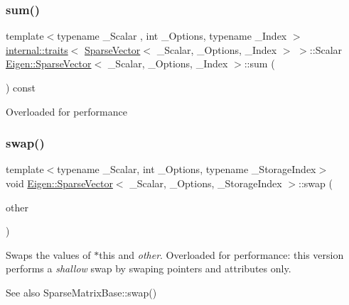 \subsubsection{\texorpdfstring{sum()}{sum()}}
{\footnotesize\ttfamily template$<$typename \+\_\+\+Scalar , int \+\_\+\+Options, typename \+\_\+\+Index $>$ \\
\mbox{\hyperlink{struct_eigen_1_1internal_1_1traits}{internal\+::traits}}$<$ \mbox{\hyperlink{class_eigen_1_1_sparse_vector}{Sparse\+Vector}}$<$ \+\_\+\+Scalar, \+\_\+\+Options, \+\_\+\+Index $>$ $>$\+::Scalar \mbox{\hyperlink{class_eigen_1_1_sparse_vector}{Eigen\+::\+Sparse\+Vector}}$<$ \+\_\+\+Scalar, \+\_\+\+Options, \+\_\+\+Index $>$\+::sum (\begin{DoxyParamCaption}{ }\end{DoxyParamCaption}) const}

Overloaded for performance \mbox{\label{class_eigen_1_1_sparse_vector_a977f1796d4b332a0827c5a1d7b1ed561}} 
\subsubsection{\texorpdfstring{swap()}{swap()}}
{\footnotesize\ttfamily template$<$typename \+\_\+\+Scalar, int \+\_\+\+Options, typename \+\_\+\+Storage\+Index$>$ \\
void \mbox{\hyperlink{class_eigen_1_1_sparse_vector}{Eigen\+::\+Sparse\+Vector}}$<$ \+\_\+\+Scalar, \+\_\+\+Options, \+\_\+\+Storage\+Index $>$\+::swap (\begin{DoxyParamCaption}\item[{\mbox{\hyperlink{class_eigen_1_1_sparse_vector}{Sparse\+Vector}}$<$ \+\_\+\+Scalar, \+\_\+\+Options, \+\_\+\+Storage\+Index $>$ \&}]{other }\end{DoxyParamCaption})\hspace{0.3cm}{\ttfamily [inline]}}

Swaps the values of {\ttfamily $\ast$this} and {\itshape other}. Overloaded for performance\+: this version performs a {\itshape shallow} swap by swaping pointers and attributes only. \begin{DoxySeeAlso}{See also}
Sparse\+Matrix\+Base\+::swap() 
\end{DoxySeeAlso}


